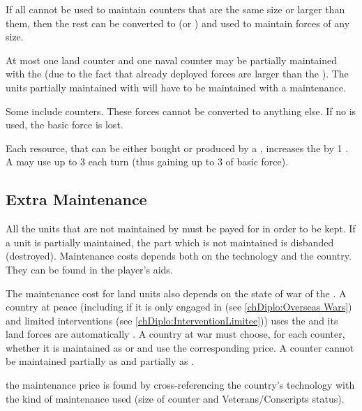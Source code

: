 \aparag If all  cannot be used to maintain counters that
are the same size or larger than them, then the rest can be converted to \LD
(or \ND) and used to maintain forces of any size.

\aparag At most one land counter and one naval counter may be partially
maintained with the  (due to the fact that already
deployed forces are larger than the ).
\bparag The units partially maintained with  will have to
be maintained with a  maintenance.

\aparag Some  include \corsaire counters. These forces
cannot be converted to anything else. If no \corsaire is used, the basic force
is lost.

\label{chLogistic:Effect of Wood Maintenance} Each
 resource, that can be either bought or produced by a \MAJ,
increases the  by 1 \ND.
\bparag A \MAJ may use up to 3  each turn (thus gaining up to 3\ND
of basic force).



\subsection{Extra Maintenance}

\aparag All the units that are not maintained by  must be
payed for in order to be kept.
\bparag If a unit is partially maintained, the part which is not maintained is
disbanded (destroyed).
\bparag Maintenance costs depends both on the technology and the country. They
can be found in the player's aids.

\aparag The maintenance cost for land units also depends on the state of war
of the \MAJ.
\bparag A country at peace (including if it is only engaged in  (see \ref{chDiplo:Overseas Wars}) and limited interventions (see
\ref{chDiplo:InterventionLimitee})) uses the  and its
land forces are automatically .
\bparag A country at war must choose, for each counter, whether it is
maintained as  or  and use the corresponding
price.
\bparag A counter cannot be maintained partially as  and
partially as .

\aparag the maintenance price is found by cross-referencing the country's
technology with the kind of maintenance used (size of counter and
Veterans/Conscripts status).

